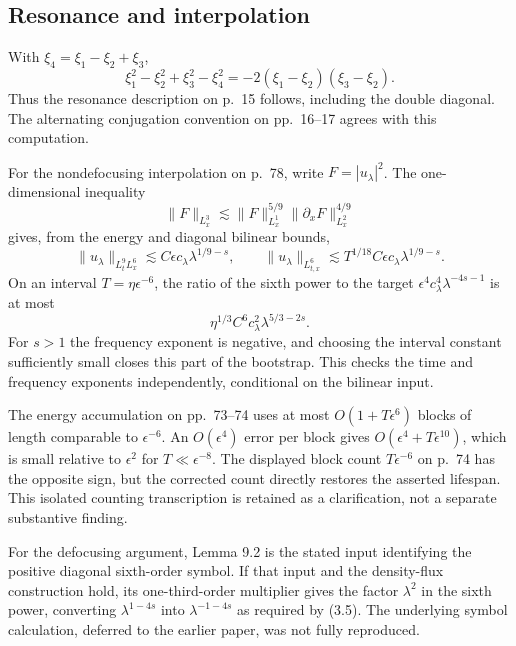 \documentclass[10pt]{article}
\begin{document}
\subsection*{Resonance and interpolation}
With \(\xi_4=\xi_1-\xi_2+\xi_3\), \[\xi_1^2-\xi_2^2+\xi_3^2-\xi_4^2
 =-2(\xi_1-\xi_2)(\xi_3-\xi_2).\] Thus the resonance description on p. 15 follows, including the double diagonal. The alternating conjugation convention on pp. 16–17 agrees with this computation.\par
For the nondefocusing interpolation on p. 78, write \(F=|u_\lambda|^2\). The one-dimensional inequality \[\|F\|_{L^3_x}\lesssim
 \|F\|_{L^1_x}^{5/9}\|\partial_xF\|_{L^2_x}^{4/9}\] gives, from the energy and diagonal bilinear bounds, \[\|u_\lambda\|_{L^9_tL^6_x}
 \lesssim C\epsilon c_\lambda\lambda^{1/9-s},\qquad
 \|u_\lambda\|_{L^6_{t,x}}
 \lesssim T^{1/18}C\epsilon c_\lambda\lambda^{1/9-s}.\] On an interval \(T=\eta\epsilon^{-6}\), the ratio of the sixth power to the target \(\epsilon^4c_\lambda^4\lambda^{-4s-1}\) is at most \[\eta^{1/3}C^6c_\lambda^2\lambda^{5/3-2s}.\] For \(s>1\) the frequency exponent is negative, and choosing the interval constant sufficiently small closes this part of the bootstrap. This checks the time and frequency exponents independently, conditional on the bilinear input.\par
The energy accumulation on pp. 73–74 uses at most \(O(1+T\epsilon^6)\) blocks of length comparable to \(\epsilon^{-6}\). An \(O(\epsilon^4)\) error per block gives \(O(\epsilon^4+T\epsilon^{10})\), which is small relative to \(\epsilon^2\) for \(T\ll\epsilon^{-8}\). The displayed block count \(T\epsilon^{-6}\) on p. 74 has the opposite sign, but the corrected count directly restores the asserted lifespan. This isolated counting transcription is retained as a clarification, not a separate substantive finding.\par
For the defocusing argument, Lemma 9.2 is the stated input identifying the positive diagonal sixth-order symbol. If that input and the density-flux construction hold, its one-third-order multiplier gives the factor \(\lambda^2\) in the sixth power, converting \(\lambda^{1-4s}\) into \(\lambda^{-1-4s}\) as required by (3.5). The underlying symbol calculation, deferred to the earlier paper, was not fully reproduced.\par
\end{document}
